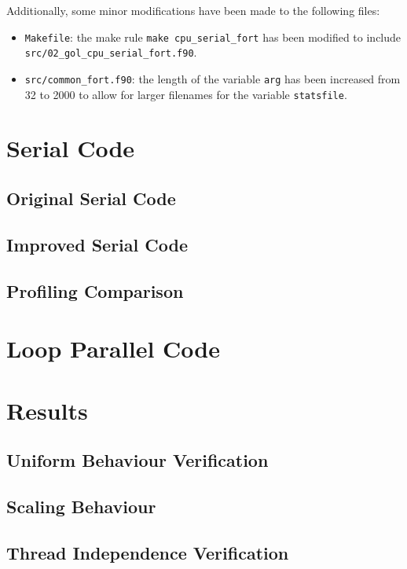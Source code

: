 \documentclass[draft]{article}
\begin{document}
Additionally, some minor modifications have been made to the following files:

\begin{itemize}
\item \lstinline{Makefile}: the make rule \lstinline{make cpu_serial_fort} has
  been modified to include \\ \lstinline{src/02_gol_cpu_serial_fort.f90}.

\item \lstinline{src/common_fort.f90}: the length of the variable
  \lstinline[basicstyle=\ttfamily\color{blue}]{arg} has been increased from 32
  to 2000 to allow for larger filenames for the variable
  \lstinline[basicstyle=\ttfamily\color{blue}]{statsfile}.
\end{itemize}

\section{Serial Code}
\label{sec:serial-code}

\subsection{Original Serial Code}
\label{sec:original-serial-code}

\subsection{Improved Serial Code}
\label{sec:improved-serial-code}

\subsection{Profiling Comparison}
\label{sec:profiling-comparison}

\section{Loop Parallel Code}
\label{sec:loop-parallel-code}

\section{Results}
\label{sec:results}

\subsection{Uniform Behaviour Verification}
\label{sec:unif-behav-verif}

\subsection{Scaling Behaviour}
\label{sec:scaling-behaviour}

\subsection{Thread Independence Verification}
\label{sec:thre-indep-verif}
\end{document}
